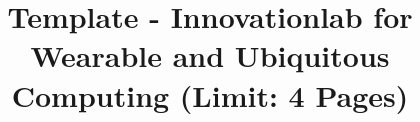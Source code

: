 \documentclass[conference]{IEEEtran}
\begin{document}
%
\title{Template - Innovationlab for Wearable and Ubiquitous Computing (Limit: 4 Pages)}




% 
\end{document}
